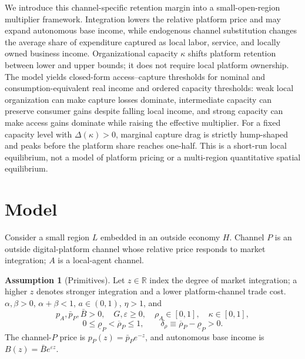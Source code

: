 \documentclass[11pt]{article}
\theoremstyle{plain}
\theoremstyle{definition}
\newtheorem{assumption}{Assumption}
\begin{document}
We introduce this channel-specific retention margin into a small-open-region
multiplier framework. Integration lowers the relative platform price and may
expand autonomous base income, while endogenous channel substitution changes
the average share of expenditure captured as local labor, service, and locally
owned business income. Organizational capacity \(\kappa\) shifts platform
retention between lower and upper bounds; it does not require local platform
ownership. The model yields closed-form access--capture thresholds for nominal
and consumption-equivalent real income and ordered capacity thresholds: weak
local organization can make capture losses dominate, intermediate capacity can
preserve consumer gains despite falling local income, and strong capacity can
make access gains dominate while raising the effective multiplier. For a fixed
capacity level with \(\Delta(\kappa)>0\), marginal capture drag is strictly
hump-shaped and peaks before the platform share reaches one-half. This is a
short-run local equilibrium, not a model of platform pricing or a multi-region
quantitative spatial equilibrium.

\section{Model}
\label{sec:model}

Consider a small region \(L\) embedded in an outside economy \(H\). Channel
\(P\) is an outside digital-platform channel whose relative price responds to
market integration; \(A\) is a local-agent channel.

\begin{assumption}[Primitives]
\label{ass:primitives}
Let \(z\in\mathbb R\) index the degree of market integration; a higher \(z\)
denotes stronger integration and a lower platform-channel trade cost.
\(
\alpha,\beta>0
\), \(
\alpha+\beta<1
\), \(
a\in(0,1)
\), \(
\eta>1
\), and
\[
 p_A,\bar p_P,\bar B>0,\quad
 G,\varepsilon\geq0,\quad \rho_A\in[0,1],\quad \kappa\in[0,1],
\]
\[
 0\leq\underline\rho_P<\overline\rho_P\leq1,\qquad
 \delta_\rho\equiv\overline\rho_P-\underline\rho_P>0.
\]
The channel-\(P\) price is \(p_P(z)=\bar p_Pe^{-z}\), and autonomous base
income is
\(B(z)=\bar Be^{\varepsilon z}\).
\end{assumption}
\end{document}
